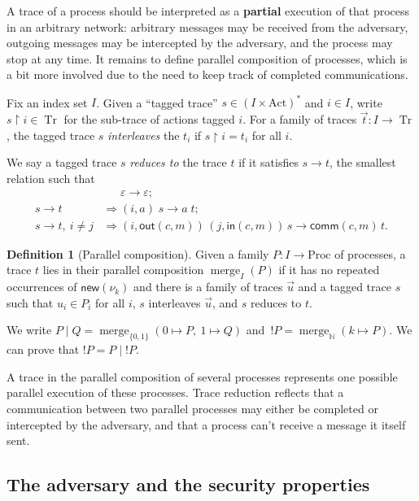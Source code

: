 \documentclass[11pt]{article}
\theoremstyle{definition}
\newtheorem{definition}{Definition}[section]
\theoremstyle{plain}
\theoremstyle{remark}
\newcommand{\N}{\mathbb{N}}
\newcommand{\Act}{\mathrm{Act}}
\newcommand{\Proc}{\mathrm{Proc}}
\newcommand{\mrg}{\operatorname{merge}}
\newcommand{\Tr}{\operatorname{Tr}}
\begin{document}
A trace of a process should be interpreted as a \textbf{partial} execution of that process in an arbitrary network: arbitrary messages may be received from the adversary, outgoing messages may be intercepted by the adversary, and the process may stop at any time. It remains to define parallel composition of processes, which is a bit more involved due to the need to keep track of completed communications.

Fix an index set $I$. Given a ``tagged trace'' $s\in(I\times\Act)^*$ and $i\in I$, write $s{\restriction}i\in\Tr$ for the sub-trace of actions tagged $i$. For a family of traces $\vec t:I\to\Tr$, the tagged trace $s$ \textit{interleaves} the $t_i$ if $s{\restriction}i=t_i$ for all $i$.

We say a tagged trace $s$ \textit{reduces to} the trace $t$ if it satisfies $s\to t$, the smallest relation such that
\begin{align*}
&\mathrel{\phantom{\Rightarrow}}\varepsilon\to\varepsilon;\\
s\to t&\Rightarrow(i,a)\;s\to a\;t;\\
s\to t,\ i\ne j&\Rightarrow(i,\mathsf{out}(c,m))\,(j,\mathsf{in}(c,m))\,s\to\mathsf{comm}(c,m)\,t.
\end{align*}

\begin{definition}[Parallel composition]\label{def:par}
Given a family $P:I\to\Proc$ of processes, a trace $t$ lies in their parallel composition $\mrg_I(P)$ if it has no repeated occurrences of $\mathsf{new}(\nu_k)$ and there is a family of traces $\vec u$ and a tagged trace $s$ such that $u_i\in P_i$ for all $i$, $s$ interleaves $\vec u$, and $s$ reduces to $t$.
\end{definition}

We write $P\mid Q=\mrg_{\{0,1\}}(0\mapsto P,\ 1\mapsto Q)$ and $\,!P=\mrg_{\N}(k\mapsto P)$. We can prove that $!P=P\mid{!P}$.

A trace in the parallel composition of several processes represents one possible parallel execution of these processes. Trace reduction reflects that a communication between two parallel processes may either be completed or intercepted by the adversary, and that a process can't receive a message it itself sent.

\subsection{The adversary and the security properties}
\end{document}

